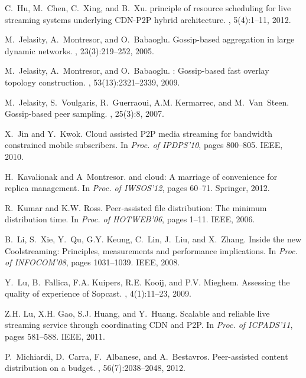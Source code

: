 {\begin{thebibliography}{5}
C.~Hu, M.~Chen, C.~Xing, and B.~Xu.
 principle of resource scheduling for live streaming systems
  underlying {CDN-P2P} hybrid architecture.
, 5(4):1--11, 2012.

M.~Jelasity, A.~Montresor, and O.~Babaoglu.
\newblock Gossip-based aggregation in large dynamic networks.
, 23(3):219--252,
  2005.

M.~Jelasity, A.~Montresor, and O.~Babaoglu.
: Gossip-based fast overlay topology construction.
, 53(13):2321--2339, 2009.

M.~Jelasity, S.~Voulgaris, R.~Guerraoui, A.M. Kermarrec, and M.~Van~Steen.
\newblock Gossip-based peer sampling.
, 25(3):8, 2007.

X.~Jin and Y.~Kwok.
\newblock Cloud assisted {P2P} media streaming for bandwidth constrained mobile
  subscribers.
\newblock In {\em Proc. of IPDPS'10}, pages 800--805. IEEE, 2010.

H.~Kavalionak and A~Montresor.
 and cloud: A marriage of convenience for replica management.
\newblock In {\em Proc. of IWSOS'12}, pages 60--71. Springer, 2012.

R.~Kumar and K.W. Ross.
\newblock Peer-assisted file distribution: The minimum distribution time.
\newblock In {\em Proc. of HOTWEB'06}, pages 1--11. IEEE, 2006.

B.~Li, S.~Xie, Y.~Qu, G.Y. Keung, C.~Lin, J.~Liu, and X.~Zhang.
\newblock Inside the new {Coolstreaming}: Principles, measurements and
  performance implications.
\newblock In {\em Proc. of INFOCOM'08}, pages 1031--1039. IEEE, 2008.

Y.~Lu, B.~Fallica, F.A. Kuipers, R.E. Kooij, and P.V. Mieghem.
\newblock Assessing the quality of experience of {Sopcast}.
,
  4(1):11--23, 2009.

Z.H. Lu, X.H. Gao, S.J. Huang, and Y.~Huang.
\newblock Scalable and reliable live streaming service through coordinating
  {CDN} and {P2P}.
\newblock In {\em Proc. of ICPADS'11}, pages 581--588. IEEE, 2011.

P.~Michiardi, D.~Carra, F.~Albanese, and A.~Bestavros.
\newblock Peer-assisted content distribution on a budget.
, 56(7):2038--2048, 2012.


\end{thebibliography}}
